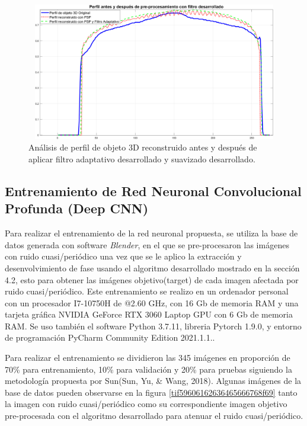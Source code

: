 \documentclass[10pt,letterpaper]{article}
\begin{document}
\begin{figure}[H]
	\centering
    \includegraphics[height=6cm,width=12cm]{tifs/tif58.png}
    \caption{Análisis de perfil de objeto 3D reconstruido antes y después de aplicar filtro adaptativo desarrollado y suavizado desarrollado.}
    \label{tif58}
\end{figure}

\subsection{Entrenamiento de Red Neuronal Convolucional Profunda (Deep CNN)}

Para realizar el entrenamiento de la red neuronal propuesta, se utiliza la base de datos generada con software \textit{Blender}, en el que se pre-procesaron las imágenes con ruido cuasi/periódico una vez que se le aplico la extracción y desenvolvimiento de fase usando el algoritmo desarrollado mostrado en la sección 4.2, esto para obtener las imágenes objetivo(target) de cada imagen afectada por ruido cuasi/periódico. Este entrenamiento se realizo en un ordenador personal con un procesador I7-10750H de @2.60 GHz, con 16 Gb de memoria RAM y una tarjeta gráfica NVIDIA GeForce RTX 3060 Laptop GPU con 6 Gb de memoria RAM. Se uso también el software Python 3.7.11, libreria Pytorch 1.9.0, y entorno de programación PyCharm Community Edition 2021.1.1.. 

Para realizar el entrenamiento se dividieron las 345 imágenes en proporción de 70\% para entrenamiento, 10\% para validación y 20\% para pruebas siguiendo la metodología propuesta por Sun(Sun, Yu, \& Wang, 2018)\cite{Sun:Yu}. Algunas imágenes de la base de datos pueden observarse en la figura \ref{tif59606162636465666768f69} tanto la imagen con ruido cuasi/periódico como su correspondiente imagen objetivo pre-procesada con el algoritmo desarrollado para atenuar el ruido cuasi/periódico.
\end{document}

